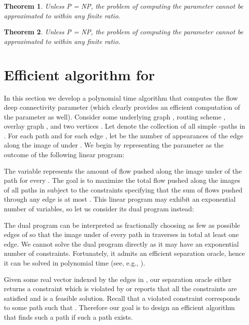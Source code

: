 \LongVersion \documentclass[11pt]{article}
\newtheorem{theorem}{Theorem}[section]
\theoremstyle{definition}
\theoremstyle{plain}
\begin{document}
\begin{theorem} \label{theorem:HardnessSPDDC}
Unless P = NP, the problem of computing the parameter  cannot be approximated to within any finite ratio.
\end{theorem}

\begin{theorem} \label{theorem:HardnessAllPairsSPDDC}
Unless P = NP, the problem of computing the parameter 
cannot be approximated to within any finite ratio.
\end{theorem}

\section{Efficient algorithm for }
\label{section:EfficientAlgorithmFDC}


In this section we develop a polynomial time algorithm that computes the
flow deep connectivity parameter  (which clearly provides
an efficient computation of the parameter  as well).
Consider some underlying graph , routing scheme , overlay graph ,
and two vertices .
Let  denote the collection of all simple -paths in .
For each path  and for each edge , let
 be the number of appearances of the edge  along the image of
 under .
We begin by representing the parameter  as the outcome of the
following linear program:


The variable  represents the amount of flow pushed along the image
under  of the path  for every .
The goal is to maximize the total flow pushed along the images of all paths in
 subject to the constraints specifying that the sum of flows
pushed through any edge is at most .
This linear program may exhibit an exponential number of variables, so let us
consider its dual program instead:


The dual program can be interpreted as fractionally choosing as few as
possible edges of  so that the image under  of every path  in
 traverses in total at least one edge.
We cannot solve the dual program directly as it may have an exponential
number of constraints.
Fortunately, it admits an efficient separation oracle, hence it can be solved
in polynomial time (see, e.g., \cite{GLS93}).

Given some real vector  indexed by the edges in , our
separation oracle either returns a constraint which is violated by 
or reports that all the constraints are satisfied and  is a feasible
solution.
Recall that a violated constraint corresponds to some path 
such that .
Therefore our goal is to design an efficient algorithm that finds such
a path  if such a path exists.
\end{document}
